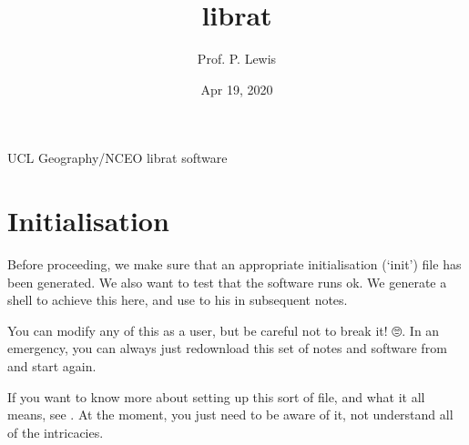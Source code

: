 \documentclass[letterpaper,10pt,english]{sphinxmanual}
\title{librat}
\date{Apr 19, 2020}
\author{Prof.\@{} P.\@{} Lewis}
\let\sphinxpxdimen\pdfpxdimen\else\newdimen\sphinxpxdimen
\begin{document}
\pagestyle{empty}
\sphinxmaketitle
\pagestyle{plain}
\sphinxtableofcontents
\pagestyle{normal}
\label{\detokenize{index::doc}}


UCL Geography/NCEO librat software

\sphinxincludegraphics[width=262\sphinxpxdimen,height=85\sphinxpxdimen]{{ucl_logo}.png}


\chapter{Initialisation}
\label{\detokenize{Chapter1:Initialisation}}\label{\detokenize{Chapter1::doc}}
Before proceeding, we make sure that an appropriate initialisation (‘init’) file has been generated. We also want to test that the software runs ok. We generate a  shell to achieve this here, and use to his in subsequent notes.

You can modify any of this as a user, but be careful not to break it! 🙄. In an emergency, you can always just re\sphinxhyphen{}download this set of notes and software from  and start again.

If you want to know more about setting up this sort of file, and what it all means, see . At the moment, you just need to be aware of it, not understand all of the intricacies.
\end{document}
